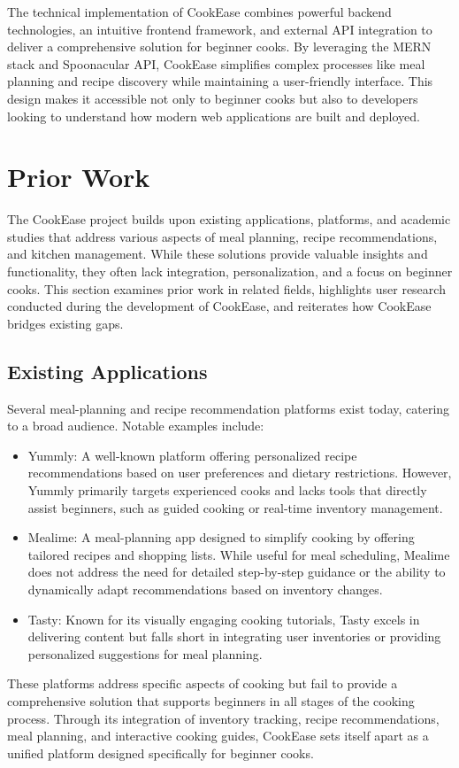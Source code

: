 \documentclass[10pt,twocolumn]{article}
\begin{document}
The technical implementation of CookEase combines powerful backend technologies, an intuitive frontend framework, and external API integration to deliver a comprehensive solution for beginner cooks. By leveraging the MERN stack and Spoonacular API, CookEase simplifies complex processes like meal planning and recipe discovery while maintaining a user-friendly interface. This design makes it accessible not only to beginner cooks but also to developers looking to understand how modern web applications are built and deployed.

\section{Prior Work}
The CookEase project builds upon existing applications, platforms, and academic studies that address various aspects of meal planning, recipe recommendations, and kitchen management. While these solutions provide valuable insights and functionality, they often lack integration, personalization, and a focus on beginner cooks. This section examines prior work in related fields, highlights user research conducted during the development of CookEase, and reiterates how CookEase bridges existing gaps.

\subsection{Existing Applications}
Several meal-planning and recipe recommendation platforms exist today, catering to a broad audience. Notable examples include:
\begin{itemize}
    \item Yummly: A well-known platform offering personalized recipe recommendations based on user preferences and dietary restrictions. However, Yummly primarily targets experienced cooks and lacks tools that directly assist beginners, such as guided cooking or real-time inventory management\cite{Yummly}.
    \item Mealime: A meal-planning app designed to simplify cooking by offering tailored recipes and shopping lists. While useful for meal scheduling, Mealime does not address the need for detailed step-by-step guidance or the ability to dynamically adapt recommendations based on inventory changes\cite{Mealime}.
    \item Tasty: Known for its visually engaging cooking tutorials, Tasty excels in delivering content but falls short in integrating user inventories or providing personalized suggestions for meal planning\cite{Tasty}.
\end{itemize}
These platforms address specific aspects of cooking but fail to provide a comprehensive solution that supports beginners in all stages of the cooking process. Through its integration of inventory tracking, recipe recommendations, meal planning, and interactive cooking guides, CookEase sets itself apart as a unified platform designed specifically for beginner cooks.
\end{document}
